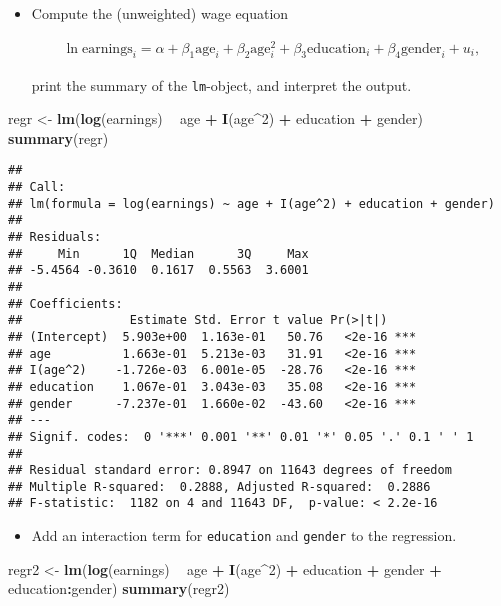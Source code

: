 \documentclass[]{article}
\newenvironment{Shaded}{\begin{snugshade}}{\end{snugshade}}
\newcommand{\KeywordTok}[1]{\textcolor[rgb]{0.13,0.29,0.53}{\textbf{#1}}}
\newcommand{\DecValTok}[1]{\textcolor[rgb]{0.00,0.00,0.81}{#1}}
\newcommand{\StringTok}[1]{\textcolor[rgb]{0.31,0.60,0.02}{#1}}
\newcommand{\OperatorTok}[1]{\textcolor[rgb]{0.81,0.36,0.00}{\textbf{#1}}}
\newcommand{\NormalTok}[1]{#1}
\providecommand{\tightlist}{%
  \setlength{\itemsep}{0pt}\setlength{\parskip}{0pt}}
\begin{document}
\begin{itemize}
\tightlist
\item
  Compute the (unweighted) wage equation

  \begin{align*}
  \ln \text{earnings}_{i}=\alpha +\beta _{1}\text{age}_{i}+\beta _{2}\text{age}_{i}^{2}+\beta _{3}\text{education}_{i}+\beta _{4}\text{gender}_{i}+u_{i},
  \end{align*}

  print the summary of the \texttt{lm}-object, and interpret the output.
\end{itemize}

\begin{Shaded}
\begin{Highlighting}[]
\NormalTok{regr <-}\StringTok{ }\KeywordTok{lm}\NormalTok{(}\KeywordTok{log}\NormalTok{(earnings) }\OperatorTok{~}\StringTok{ }\NormalTok{age }\OperatorTok{+}\StringTok{ }\KeywordTok{I}\NormalTok{(age}\OperatorTok{^}\DecValTok{2}\NormalTok{) }\OperatorTok{+}\StringTok{ }\NormalTok{education }\OperatorTok{+}\StringTok{ }\NormalTok{gender)}
\KeywordTok{summary}\NormalTok{(regr)}
\end{Highlighting}
\end{Shaded}

\begin{verbatim}
## 
## Call:
## lm(formula = log(earnings) ~ age + I(age^2) + education + gender)
## 
## Residuals:
##     Min      1Q  Median      3Q     Max 
## -5.4564 -0.3610  0.1617  0.5563  3.6001 
## 
## Coefficients:
##               Estimate Std. Error t value Pr(>|t|)    
## (Intercept)  5.903e+00  1.163e-01   50.76   <2e-16 ***
## age          1.663e-01  5.213e-03   31.91   <2e-16 ***
## I(age^2)    -1.726e-03  6.001e-05  -28.76   <2e-16 ***
## education    1.067e-01  3.043e-03   35.08   <2e-16 ***
## gender      -7.237e-01  1.660e-02  -43.60   <2e-16 ***
## ---
## Signif. codes:  0 '***' 0.001 '**' 0.01 '*' 0.05 '.' 0.1 ' ' 1
## 
## Residual standard error: 0.8947 on 11643 degrees of freedom
## Multiple R-squared:  0.2888, Adjusted R-squared:  0.2886 
## F-statistic:  1182 on 4 and 11643 DF,  p-value: < 2.2e-16
\end{verbatim}

\begin{itemize}
\tightlist
\item
  Add an interaction term for \texttt{education} and \texttt{gender} to
  the regression.
\end{itemize}

\begin{Shaded}
\begin{Highlighting}[]
\NormalTok{regr2 <-}\StringTok{ }\KeywordTok{lm}\NormalTok{(}\KeywordTok{log}\NormalTok{(earnings) }\OperatorTok{~}\StringTok{ }\NormalTok{age }\OperatorTok{+}\StringTok{ }\KeywordTok{I}\NormalTok{(age}\OperatorTok{^}\DecValTok{2}\NormalTok{) }\OperatorTok{+}\StringTok{ }\NormalTok{education }\OperatorTok{+}\StringTok{ }\NormalTok{gender }\OperatorTok{+}\StringTok{ }\NormalTok{education}\OperatorTok{:}\NormalTok{gender) }
\KeywordTok{summary}\NormalTok{(regr2)}
\end{Highlighting}
\end{Shaded}
\end{document}
